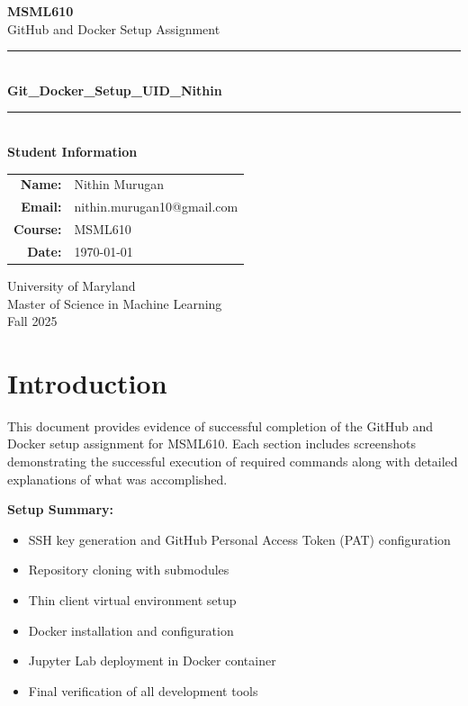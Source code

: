 \documentclass[11pt,letterpaper]{article}
\begin{document}
\begin{titlepage}
    \centering
    \vspace*{2cm}
    
    {\Huge\bfseries MSML610\\[0.5cm]}
    {\LARGE GitHub and Docker Setup Assignment\\[1.5cm]}
    
    \rule{\textwidth}{0.4pt}\\[0.5cm]
    {\Large\textbf{Git\_Docker\_Setup\_UID\_Nithin}}\\[0.3cm]
    \rule{\textwidth}{0.4pt}\\[2cm]
    
    {\Large\textbf{Student Information}\\[0.5cm]}
    \begin{tabular}{rl}
        \textbf{Name:} & Nithin Murugan \\[0.3cm]
        \textbf{Email:} & nithin.murugan10@gmail.com \\[0.3cm]
        \textbf{Course:} & MSML610 \\[0.3cm]
        \textbf{Date:} & \today \\
    \end{tabular}
    
    \vfill
    
    {\large University of Maryland\\
    Master of Science in Machine Learning\\
    Fall 2025}
\end{titlepage}

\newpage
\tableofcontents
\newpage

\section*{Introduction}

This document provides evidence of successful completion of the GitHub and Docker setup assignment for MSML610. Each section includes screenshots demonstrating the successful execution of required commands along with detailed explanations of what was accomplished.

\vspace{0.5cm}
\noindent\textbf{Setup Summary:}
\begin{itemize}[leftmargin=2cm]
    \item SSH key generation and GitHub Personal Access Token (PAT) configuration
    \item Repository cloning with submodules
    \item Thin client virtual environment setup
    \item Docker installation and configuration
    \item Jupyter Lab deployment in Docker container
    \item Final verification of all development tools
\end{itemize}
\end{document}
